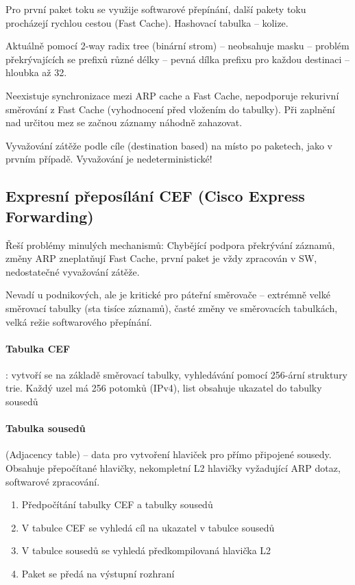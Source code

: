 \documentclass[a4paper, 11pt]{report}
\begin{document}
Pro první paket toku se využije softwarové přepínání, další pakety toku procházejí rychlou cestou (Fast Cache). Hashovací tabulka -- kolize.

Aktuálně pomocí 2-way radix tree (binární strom) -- neobsahuje masku -- problém překrývajících se prefixů různé délky -- pevná dílka prefixu pro každou destinaci -- hloubka až 32.

Neexistuje synchronizace mezi ARP cache a Fast Cache, nepodporuje rekurivní směrování z Fast Cache (vyhodnocení před vložením do tabulky). Při zaplnění nad určitou mez se začnou záznamy náhodně zahazovat.

Vyvažování zátěže podle cíle (destination based) na místo po paketech, jako v prvním případě. Vyvažování je nedeterministické!

\subsection{Expresní přeposílání CEF (Cisco Express Forwarding)}
Řeší problémy minulých mechanismů: Chybějící podpora překrývání záznamů, změny ARP zneplatňují Fast Cache, první paket je vždy zpracován v SW, nedostatečné vyvažování zátěže.

Nevadí u podnikových, ale je kritické pro páteřní směrovače -- extrémně velké směrovací tabulky (sta tisíce záznamů), časté změny ve směrovacích tabulkách, velká režie softwarového přepínání.

\paragraph{Tabulka CEF}: vytvoří se na základě směrovací tabulky, vyhledávání pomocí 256-ární struktury trie. Každý uzel má 256 potomků (IPv4), list obsahuje ukazatel do tabulky sousedů

\paragraph{Tabulka sousedů} (Adjacency table) -- data pro vytvoření hlaviček pro přímo připojené sousedy. Obsahuje přepočítané hlavičky, nekompletní L2 hlavičky vyžadující ARP dotaz, softwarové zpracování.

\begin{enumerate}
	\item Předpočítání tabulky CEF a tabulky sousedů
	\item V tabulce CEF se vyhledá cíl na ukazatel v tabulce sousedů
	\item V tabulce sousedů se vyhledá předkompilovaná hlavička L2
	\item Paket se předá na výstupní rozhraní
\end{enumerate}
\end{document}
